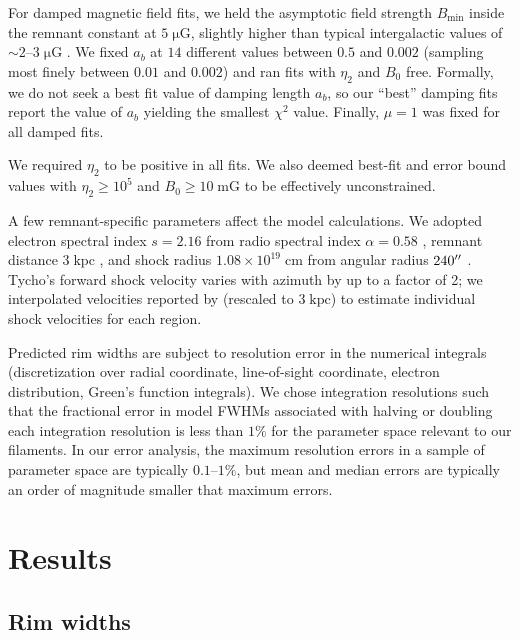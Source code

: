 \documentclass[iop, apj, numberedappendix]{emulateapj}
\newcommand*{\mt}{\mathrm}
\newcommand*{\unit}[1]{\;\mt{#1}}  %
\newcommand*{\abt}{\mathord{\sim}} %
\newcommand*{\Bmin}{B_{\mt{min}}}
\newcommand*{\muG}{\unit{\mu G}}
\begin{document}
For damped magnetic field fits, we held the asymptotic field strength
$\Bmin$ inside the remnant constant at $5 \muG$, slightly higher than
typical intergalactic values of $\abt 2$--$3 \muG$ \citep{lyne1989, han2006}.
We fixed $a_b$ at $14$ different values between $0.5$ and $0.002$ (sampling
most finely between $0.01$ and $0.002$) and ran fits with $\eta_2$ and $B_0$
free.  Formally, we do not seek a best fit value of damping length $a_b$, so
our ``best'' damping fits report the value of $a_b$ yielding the smallest
$\chi^2$ value.  Finally, $\mu = 1$ was fixed for all damped fits.

We required $\eta_2$ to be positive in all fits.  We also deemed
best-fit and error bound values with $\eta_2 \geq 10^5$ and $B_0 \geq 10
\unit{mG}$ to be effectively unconstrained. %

A few remnant-specific parameters affect the model calculations.  We adopted
electron spectral index $s = 2.16$ from radio spectral index $\alpha = 0.58$
\citep{sun2011}, remnant distance $3 \unit{kpc}$ \citep[cf.][]{hayato2010}, and
shock radius $1.08 \times 10^{19} \unit{cm}$ from angular radius $240\mbox{$^{\prime\prime}$}$
\citep{green2014}.  Tycho's forward shock velocity varies with azimuth by up to
a factor of 2; we interpolated velocities reported by \citet{williams2013}
(rescaled to $3 \unit{kpc}$) to estimate individual shock velocities for each
region.

Predicted rim widths are subject to resolution error in the numerical integrals
(discretization over radial coordinate, line-of-sight coordinate, electron
distribution, Green's function integrals).  We chose integration resolutions
such that the fractional error in model FWHMs associated with halving or
doubling each integration resolution is less than $1\%$ for the parameter space
relevant to our filaments.  In our error analysis, the maximum resolution
errors in a sample of parameter space are typically $0.1$--$1\%$, but mean and
median errors are typically an order of magnitude smaller that maximum errors.

\section{Results}

\subsection{Rim widths}
\label{sec:fwhm-results}
\end{document}
